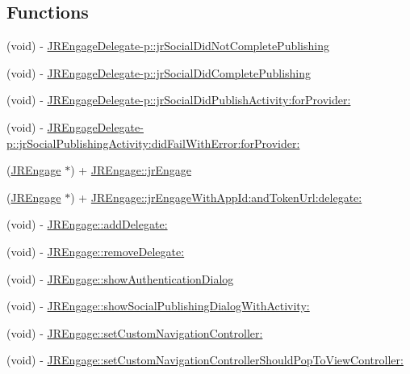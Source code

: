 \subsection*{Functions}
\begin{DoxyCompactItemize}
\item 
(void) -\/ \hyperlink{group___social_publishing_messages_ga733007b584bd916932ccafe44c3c678d}{JREngageDelegate-\/p::jrSocialDidNotCompletePublishing}
\item 
(void) -\/ \hyperlink{group___social_publishing_messages_gae90fea5db002559f6cf4e481080e0bfb}{JREngageDelegate-\/p::jrSocialDidCompletePublishing}
\item 
(void) -\/ \hyperlink{group___social_publishing_messages_ga4c3fd988961c22202786b400ddd889cc}{JREngageDelegate-\/p::jrSocialDidPublishActivity:forProvider:}
\item 
(void) -\/ \hyperlink{group___social_publishing_messages_gaf6564add3b2fdbed2efbb118ddcf26ed}{JREngageDelegate-\/p::jrSocialPublishingActivity:didFailWithError:forProvider:}
\item 
(\hyperlink{interface_j_r_engage}{JREngage} $\ast$) + \hyperlink{group___social_publishing_messages_gadb6bf3a6869d83f2bfce0783f128d9e6}{JREngage::jrEngage}
\item 
(\hyperlink{interface_j_r_engage}{JREngage} $\ast$) + \hyperlink{group___social_publishing_messages_ga36c199d6384893b1bf42712771af1e8b}{JREngage::jrEngageWithAppId:andTokenUrl:delegate:}
\item 
(void) -\/ \hyperlink{group___social_publishing_messages_ga18377ffb55f821587e6d38b3489692e8}{JREngage::addDelegate:}
\item 
(void) -\/ \hyperlink{group___social_publishing_messages_gab3f12ac148ea0f6df4d7ff7789cc7c94}{JREngage::removeDelegate:}
\item 
(void) -\/ \hyperlink{group___social_publishing_messages_ga01ecdff491f91543e18f33d0e565b046}{JREngage::showAuthenticationDialog}
\item 
(void) -\/ \hyperlink{group___social_publishing_messages_gafca7b5ab9a57edc1a460aaec882207c4}{JREngage::showSocialPublishingDialogWithActivity:}
\item 
(void) -\/ \hyperlink{group___social_publishing_messages_ga6c704bbff377d20603e6b52bd0ae17f1}{JREngage::setCustomNavigationController:}
\item 
(void) -\/ \hyperlink{group___social_publishing_messages_gaab4958af5f9b2903e795519caf0af4eb}{JREngage::setCustomNavigationControllerShouldPopToViewController:}
\item 

\end{DoxyCompactItemize}
